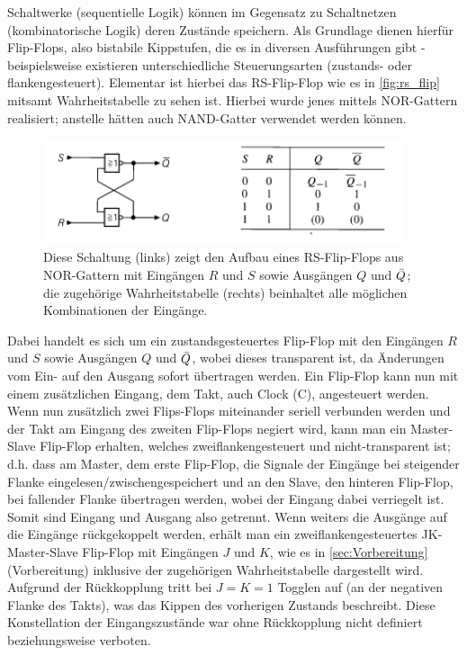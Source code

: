 Schaltwerke (sequentielle Logik) können im Gegensatz zu 
Schaltnetzen (kombinatorische Logik) deren Zustände
speichern. Als Grundlage dienen hierfür Flip-Flops,
also bistabile Kippstufen, die es in diversen
Ausführungen gibt - beispielsweise existieren unterschiedliche
Steuerungsarten (zustands- oder flankengesteuert). 
Elementar ist hierbei das RS-Flip-Flop wie es in
\autoref{fig:rs_flip} mitsamt Wahrheitstabelle zu sehen ist. Hierbei wurde jenes
mittels NOR-Gattern realisiert; anstelle hätten auch
NAND-Gatter verwendet werden können.
\begin{figure}[H]
  \centering
    \includegraphics[width=0.95\textwidth]{figures/rs_ff.png}
    \caption{Diese Schaltung (links) zeigt den Aufbau eines
    RS-Flip-Flops aus NOR-Gattern mit Eingängen $R$ und
    $S$ sowie Ausgängen $Q$ und $\Bar{Q}$; die zugehörige
    Wahrheitstabelle (rechts) beinhaltet alle möglichen
    Kombinationen der Eingänge. \cite{tietze}
  }
  \label{fig:rs_flip}
\end{figure}
Dabei handelt es sich um ein zustandsgesteuertes
Flip-Flop mit den Eingängen $R$ und $S$ sowie
Ausgängen $Q$ und $\Bar{Q}$, wobei dieses
transparent ist, da Änderungen vom Ein- auf den
Ausgang sofort übertragen werden.
Ein Flip-Flop kann nun mit einem zusätzlichen
Eingang, dem Takt, auch Clock (C),
angesteuert werden. Wenn nun zusätzlich zwei Flips-Flops miteinander
seriell verbunden werden und der Takt am Eingang des zweiten Flip-Flops 
negiert wird, kann man ein Master-Slave Flip-Flop erhalten, welches
zweiflankengesteuert und nicht-transparent ist; d.h. dass am Master, dem erste Flip-Flop, die
Signale der Eingänge bei steigender Flanke eingelesen/zwischengespeichert
und an den Slave, den hinteren Flip-Flop, bei fallender Flanke
übertragen werden, wobei der Eingang dabei verriegelt ist.
Somit sind Eingang und Ausgang also getrennt.
Wenn weiters die Ausgänge auf die Eingänge rückgekoppelt
werden, erhält man ein zweiflankengesteuertes JK-Master-Slave
Flip-Flop mit Eingängen $J$ und $K$, wie es in \autoref{sec:Vorbereitung} 
(Vorbereitung) inklusive
der zugehörigen Wahrheitstabelle dargestellt wird. Aufgrund
der Rückkopplung tritt bei $J=K=1$  Togglen auf (an der negativen Flanke des Takts),
was das Kippen des vorherigen Zustands beschreibt. Diese Konstellation der
Eingangszustände war ohne Rückkopplung nicht definiert beziehungsweise verboten.

